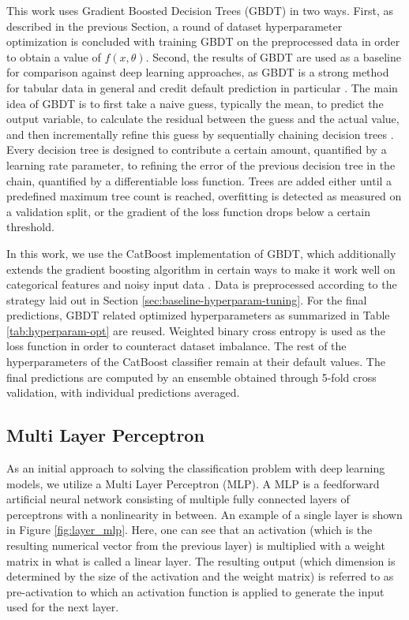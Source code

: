 \documentclass[runningheads]{llncs}
\begin{document}
This work uses Gradient Boosted Decision Trees (GBDT) in two ways. First, as described in the previous Section, a round of dataset hyperparameter optimization is concluded with training GBDT on the preprocessed data in order to obtain a value of $f(x, \theta)$. Second, the results of GBDT are used as a baseline for comparison against deep learning approaches, as GBDT is a strong method for tabular data in general and credit default prediction in particular \cite{addo2018credit}.
The main idea of GBDT is to first take a naive guess, typically the mean, to predict the output variable, to calculate the residual between the guess and the actual value, and then incrementally refine this guess by sequentially chaining decision trees \cite{prokhorenkova2018catboost}. Every decision tree is designed to contribute a certain amount, quantified by a learning rate parameter, to refining the error of the previous decision tree in the chain, quantified by a differentiable loss function. Trees are added either until a predefined maximum tree count is reached, overfitting is detected as measured on a validation split, or the gradient of the loss function drops below a certain threshold.

In this work, we use the CatBoost implementation of GBDT, which additionally extends the gradient boosting algorithm in certain ways to make it work well on categorical features and noisy input data \cite{prokhorenkova2018catboost}. Data is preprocessed according to the strategy laid out in Section \ref{sec:baseline-hyperparam-tuning}. For the final predictions, GBDT related optimized  hyperparameters as summarized in Table \ref{tab:hyperparam-opt} are reused. Weighted binary cross entropy is used as the loss function in order to counteract dataset imbalance. The rest of the hyperparameters of the CatBoost classifier remain at their default values. The final predictions are computed by an ensemble obtained through 5-fold cross validation, with individual predictions averaged.


\subsection{Multi Layer Perceptron}
\label{subsec:mlp}

As an initial approach to solving the classification problem with deep learning models, we utilize a Multi Layer Perceptron (MLP). A MLP is a feedforward artificial neural network consisting of multiple fully connected layers of perceptrons with a nonlinearity in between. An example of a single layer is shown in Figure \ref{fig:layer_mlp}. Here, one can see that an activation (which is the resulting numerical vector from the previous layer) is multiplied with a weight matrix in what is called a linear layer. The resulting output (which dimension is determined by the size of the activation and the weight matrix) is referred to as pre-activation to which an activation function is applied to generate the input used for the next layer.
\end{document}
